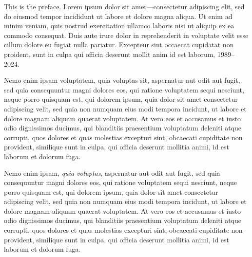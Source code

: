 
This is the preface. Lorem ipsum dolor sit amet---consectetur adipiscing elit, sed do eiusmod tempor incididunt ut labore et dolore magna aliqua. Ut enim ad minim veniam, quis nostrud exercitation ullamco laboris nisi ut aliquip ex ea commodo consequat. Duis aute irure dolor in reprehenderit in voluptate velit esse cillum dolore eu fugiat nulla pariatur. Excepteur sint occaecat cupidatat non proident, sunt in culpa qui officia deserunt mollit anim id est laborum, 1989--2024.

Nemo enim ipsam voluptatem, quia voluptas sit, aspernatur aut odit aut fugit, sed quia consequuntur magni dolores eos, qui ratione voluptatem sequi nesciunt, neque porro quisquam est, qui dolorem ipsum, quia dolor sit amet consectetur adipiscing velit, sed quia non numquam eius modi tempora incidunt, ut labore et dolore magnam aliquam quaerat voluptatem. At vero eos et accusamus et iusto odio dignissimos ducimus, qui blanditiis praesentium voluptatum deleniti atque corrupti, quos dolores et quas molestias excepturi sint, obcaecati cupiditate non provident, similique sunt in culpa, qui officia deserunt mollitia animi, id est laborum et dolorum fuga.

Nemo enim ipsam, \textit{quia voluptas}, aspernatur aut odit aut fugit, sed quia consequuntur magni dolores eos, qui ratione voluptatem sequi nesciunt, neque porro quisquam est, qui dolorem ipsum, quia dolor sit amet consectetur adipiscing velit, sed quia non numquam eius modi tempora incidunt, ut labore et dolore magnam aliquam quaerat voluptatem. At vero eos et accusamus et iusto odio dignissimos ducimus, qui blanditiis praesentium voluptatum deleniti atque corrupti, quos dolores et quas molestias excepturi sint, obcaecati cupiditate non provident, similique sunt in culpa, qui officia deserunt mollitia animi, id est laborum et dolorum fuga.